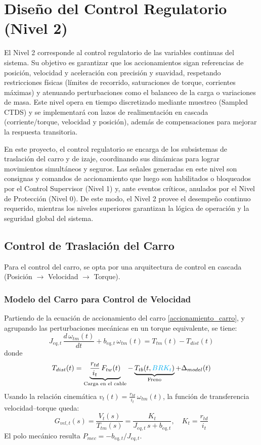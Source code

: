\documentclass[11pt]{article}                                    %
\begin{document}
\section{Diseño del Control Regulatorio (Nivel 2)}
El Nivel 2 corresponde al control regulatorio de las variables continuas del sistema. Su objetivo es garantizar que los accionamientos sigan referencias de posición, velocidad y aceleración con precisión y suavidad, respetando restricciones físicas (límites de recorrido, saturaciones de torque, corrientes máximas) y atenuando perturbaciones como el balanceo de la carga o variaciones de masa. Este nivel opera en tiempo discretizado mediante muestreo (Sampled CTDS) y se implementará con lazos de realimentación en cascada (corriente/torque, velocidad y posición), además de compensaciones para mejorar la respuesta transitoria.

En este proyecto, el control regulatorio se encarga de los subsistemas de traslación del carro y de izaje, coordinando sus dinámicas para lograr movimientos simultáneos y seguros. Las señales generadas en este nivel son consignas y comandos de accionamiento que luego son habilitados o bloqueados por el Control Supervisor (Nivel 1) y, ante eventos críticos, anulados por el Nivel de Protección (Nivel 0). De este modo, el Nivel 2 provee el desempeño continuo requerido, mientras los niveles superiores garantizan la lógica de operación y la seguridad global del sistema.


\subsection{Control de Traslación del Carro}
Para el control del carro, se opta por una arquitectura de control en cascada (Posición $\to$ Velocidad $\to$ Torque).

\subsubsection{Modelo del Carro para Control de Velocidad}
Partiendo de la ecuación de accionamiento del carro \eqref{accionamiento_carro}, y agrupando las perturbaciones mecánicas en un torque equivalente, se tiene:
\begin{equation}
    J_{eq,t}\,\frac{d \, \omega_{tm}(t)}{dt} + b_{eq,t}\,\omega_{tm}(t) = T_{tm}(t) - T_{dist}(t)
\end{equation}
donde
\begin{equation}
    T_{dist}(t) = \underbrace{\frac{r_{td}}{i_t}\,F_{tw}(t)}_{\text{Carga en el cable}}
    - \underbrace{T_{tb}(t,\textcolor{cyan}{BRK_t})}_{\text{Freno}}
    + \Delta_{model}(t)
\end{equation}
Usando la relación cinemática $v_t(t) = \frac{r_{td}}{i_t}\,\omega_{tm}(t)$, la función de transferencia velocidad--torque queda:
\begin{equation}
    G_{vel,t}(s) = \frac{V_t(s)}{T_{tm}(s)} = \frac{K_t}{J_{eq,t}\,s + b_{eq,t}}, \quad K_t = \frac{r_{td}}{i_t}
\end{equation}
El polo mecánico resulta $P_{mec} = -b_{eq,t}/J_{eq,t}$.
\end{document}
